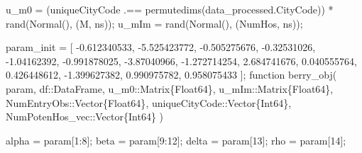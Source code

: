 \documentclass[
  letterpaper,
  DIV=11,
  numbers=noendperiod]{scrreprt}
\newenvironment{Shaded}{\begin{snugshade}}{\end{snugshade}}
\newcommand{\CharTok}[1]{\textcolor[rgb]{0.13,0.47,0.30}{#1}}
\newcommand{\DataTypeTok}[1]{\textcolor[rgb]{0.68,0.00,0.00}{#1}}
\newcommand{\FloatTok}[1]{\textcolor[rgb]{0.68,0.00,0.00}{#1}}
\newcommand{\FunctionTok}[1]{\textcolor[rgb]{0.28,0.35,0.67}{#1}}
\newcommand{\KeywordTok}[1]{\textcolor[rgb]{0.00,0.23,0.31}{#1}}
\newcommand{\NormalTok}[1]{\textcolor[rgb]{0.00,0.23,0.31}{#1}}
\newcommand{\OperatorTok}[1]{\textcolor[rgb]{0.37,0.37,0.37}{#1}}
\begin{document}
\begin{Shaded}
\begin{Highlighting}[]
\NormalTok{u\_m0 }\OperatorTok{=}\NormalTok{ (uniqueCityCode }\OperatorTok{.==} \FunctionTok{permutedims}\NormalTok{(data\_processed.CityCode))}\CharTok{\textquotesingle{} * rand(Normal(), (M, ns));}
\NormalTok{u\_mIm }\OperatorTok{=} \FunctionTok{rand}\NormalTok{(}\FunctionTok{Normal}\NormalTok{(), (NumHos, ns));}
\end{Highlighting}
\end{Shaded}

\begin{Shaded}
\begin{Highlighting}[]
\NormalTok{param\_init }\OperatorTok{=}\NormalTok{ [}
    \OperatorTok{{-}}\FloatTok{0.612340533}\NormalTok{,   }\OperatorTok{{-}}\FloatTok{5.525423772}\NormalTok{,   }\OperatorTok{{-}}\FloatTok{0.505275676}\NormalTok{,   }
    \OperatorTok{{-}}\FloatTok{0.32531026}\NormalTok{,    }\OperatorTok{{-}}\FloatTok{1.04162392}\NormalTok{,    }\OperatorTok{{-}}\FloatTok{0.991878025}\NormalTok{,   }
    \OperatorTok{{-}}\FloatTok{3.87040966}\NormalTok{,    }\OperatorTok{{-}}\FloatTok{1.272714254}\NormalTok{,   }\FloatTok{2.684741676}\NormalTok{,    }
    \FloatTok{0.040555764}\NormalTok{,    }\FloatTok{0.426448612}\NormalTok{,    }\OperatorTok{{-}}\FloatTok{1.399627382}\NormalTok{,   }
    \FloatTok{0.990975782}\NormalTok{,    }\FloatTok{0.958075433}
\NormalTok{];}
\KeywordTok{function} \FunctionTok{berry\_obj}\NormalTok{(}
\NormalTok{        param,}
\NormalTok{        df}\OperatorTok{::}\DataTypeTok{DataFrame}\NormalTok{,}
\NormalTok{        u\_m0}\OperatorTok{::}\DataTypeTok{Matrix\{Float64\}}\NormalTok{,}
\NormalTok{        u\_mIm}\OperatorTok{::}\DataTypeTok{Matrix\{Float64\}}\NormalTok{,}
\NormalTok{        NumEntryObs}\OperatorTok{::}\DataTypeTok{Vector\{Float64\}}\NormalTok{,}
\NormalTok{        uniqueCityCode}\OperatorTok{::}\DataTypeTok{Vector\{Int64\}}\NormalTok{,}
\NormalTok{        NumPotenHos\_vec}\OperatorTok{::}\DataTypeTok{Vector\{Int64\}}
\NormalTok{    )}
    
\NormalTok{    alpha }\OperatorTok{=}\NormalTok{ param[}\FloatTok{1}\OperatorTok{:}\FloatTok{8}\NormalTok{];}
\NormalTok{    beta }\OperatorTok{=}\NormalTok{ param[}\FloatTok{9}\OperatorTok{:}\FloatTok{12}\NormalTok{];}
\NormalTok{    delta }\OperatorTok{=}\NormalTok{ param[}\FloatTok{13}\NormalTok{];}
\NormalTok{    rho }\OperatorTok{=}\NormalTok{ param[}\FloatTok{14}\NormalTok{];}
    

\end{Highlighting}
\end{Shaded}
\end{document}
